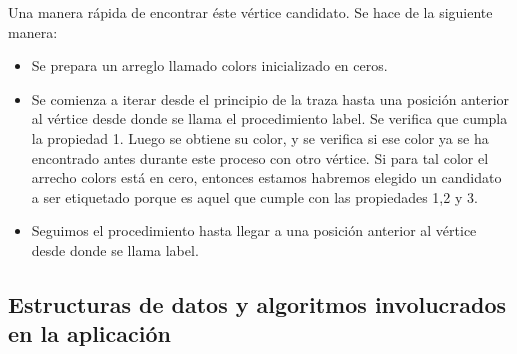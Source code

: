 \documentclass[a4paper,10pt]{article}
\begin{document}
Una manera rápida de encontrar éste vértice candidato. Se hace de la siguiente manera: 

\begin{itemize}
 \item Se prepara un arreglo llamado colors inicializado en ceros. 
 \item Se comienza a iterar desde el principio de la traza hasta una posición  anterior al vértice
	desde donde se llama el procedimiento label. Se verifica que cumpla la propiedad 1. Luego 
	se obtiene su color, y se verifica si ese color ya se ha encontrado antes durante este proceso 
	con otro vértice. Si para tal color el arrecho colors está en cero, entonces estamos habremos 
	elegido un candidato a ser etiquetado porque es aquel que cumple con las propiedades 1,2 y 3.
\item   Seguimos el procedimiento hasta llegar a una posición anterior al vértice desde donde se llama label.
\end{itemize}
 

\subsection{Estructuras de datos y algoritmos involucrados en la aplicación}
\end{document}

